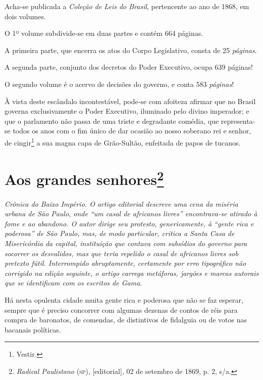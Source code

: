 Acha-se publicada a \textit{Coleção de Leis do Brasil}, pertencente ao ano de
1868, em dois volumes.

O 1º volume subdivide-se em duas partes e contém 664 páginas.

A primeira parte, que encerra os atos do Corpo Legislativo, consta de 25
\emph{páginas}.

A segunda parte, conjunto dos decretos do Poder Executivo, ocupa 639
páginas!

O segundo volume é o acervo de decisões do governo, e conta 583
\emph{páginas}!

À vista deste escândalo incontestável, pode-se com afoiteza afirmar que
no Brasil governa exclusivamente o Poder Executivo, iluminado pelo
divino imperador; e que o parlamento não passa de uma triste e
degradante comédia, que representa-se todos os anos com o fim único de
dar ocasião ao nosso soberano rei e senhor, de cingir\footnote{Vestir.}
a sua magna capa de Grão-Sultão, enfeitada de papos de tucanos.

\chapter{Aos grandes senhores\footnote{\emph{Radical Paulistano} (\textsc{sp}),
  {[}editorial{]}, 02 de setembro de 1869, p. 2, s/a.}}

\begin{didascalia}\itshape
Crônica do Baixo Império. O artigo editorial descreve uma cena da
miséria urbana de São Paulo, onde ``um casal de africanos livres''
encontrava-se atirado à fome e ao abandono. O autor dirige seu protesto,
genericamente, à ``gente rica e poderosa'' de São Paulo, mas, de modo
particular, critica a Santa Casa de Misericórdia da capital, instituição
que contava com subsídios do governo para socorrer os desvalidos, mas
que teria repelido o casal de africanos livres sob pretexto fútil.
Interrompido abruptamente, certamente por erro tipográfico não corrigido
na edição seguinte, o artigo carrega metáforas, jargões e marcas
autorais que se identificam com os escritos de Gama.
\end{didascalia}



Há nesta opulenta cidade muita gente rica e poderosa que não se faz
esperar, sempre que é preciso concorrer com algumas dezenas de contos de
réis para compra de baronatos, de comendas, de distintivos de fidalguia
ou de votos nas bacanais políticas.

